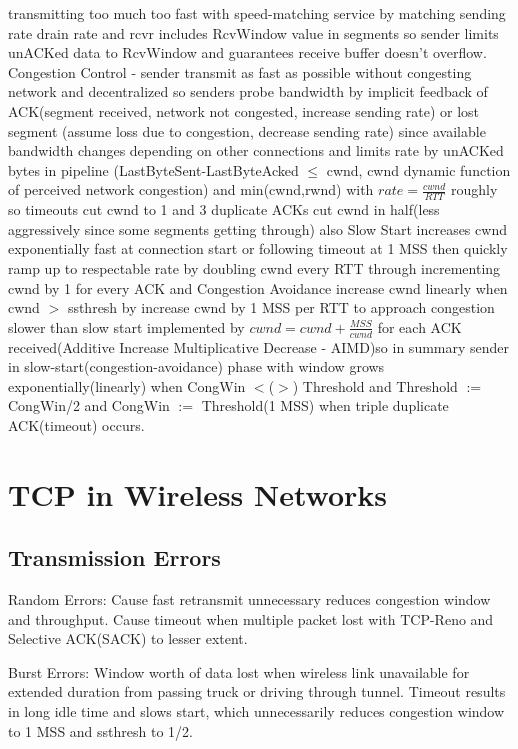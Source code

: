 \documentclass[9pt]{extarticle}
\begin{document}
\begin{multicols}{2}
transmitting too much too fast with speed-matching service by matching sending rate drain rate and rcvr includes RcvWindow value in segments so sender limits unACKed data to RcvWindow and guarantees receive buffer doesn’t overflow. Congestion Control - sender transmit as fast as possible without congesting network and decentralized so senders probe bandwidth by implicit feedback of ACK(segment received, network not congested, increase sending rate) or lost segment (assume loss due to congestion, decrease sending rate) since available bandwidth changes depending on other connections and limits rate by unACKed bytes in pipeline (LastByteSent-LastByteAcked $\leq$ cwnd, cwnd dynamic function of perceived network congestion) and min(cwnd,rwnd) with $rate=\frac{cwnd}{RTT}$ roughly so  timeouts cut cwnd to 1 and 3 duplicate ACKs cut cwnd in half(less aggressively since some segments getting through) also Slow Start increases cwnd exponentially fast at connection start or following timeout at 1 MSS then quickly ramp up to respectable rate by doubling cwnd every RTT through incrementing cwnd by 1 for every ACK and Congestion Avoidance increase cwnd linearly when cwnd $>$ ssthresh by increase cwnd by 1 MSS per RTT to approach congestion slower than slow start implemented by $cwnd=cwnd+\frac{MSS}{cwnd}$ for each ACK received(Additive Increase Multiplicative Decrease - AIMD)so in summary sender in slow-start(congestion-avoidance) phase with window grows exponentially(linearly) when CongWin $<$($>$) Threshold and Threshold $:=$ CongWin/2 and CongWin $:=$ Threshold(1 MSS) when triple duplicate ACK(timeout) occurs.

\section{TCP in Wireless Networks}

\subsection{Transmission Errors}

Random Errors: Cause fast retransmit unnecessary reduces congestion window and throughput. Cause timeout when multiple packet lost with TCP-Reno and Selective ACK(SACK) to lesser extent.

Burst Errors: Window worth of data lost when wireless link unavailable for extended duration from passing truck or driving through tunnel. Timeout results in long idle time and slows start, which unnecessarily reduces congestion window to 1 MSS and ssthresh to 1/2.


\end{multicols}
\end{document}
